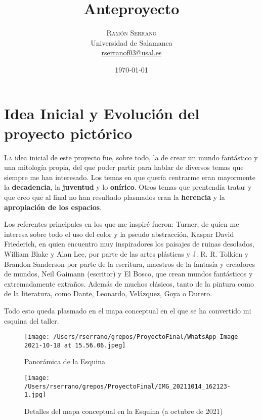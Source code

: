 \documentclass[twoside,twocolumn]{article}
\title{Anteproyecto} %
\author{%
\textsc{Ramón Serrano} \\[1ex] %
\normalsize Universidad de Salamanca \\ %
\normalsize \href{mailto:rserranof03@usal.es}{rserranof03@usal.es} %
}
\date{\today} %
\begin{document}
\maketitle


\section{Idea Inicial y Evolución del proyecto
pictórico\label{idea-inicial-y-evoluciuxf3n-del-proyecto-pictuxf3rico}}

\lettrine[nindent=0em,lines=3]{L}a idea inicial de este proyecto fue, sobre todo, la de crear un mundo
fantástico y una mitología propia, del que poder partir para hablar de
diversos temas que siempre me han interesado. Los temas en que quería
centrarme eran mayormente la \textbf{decadencia}, la \textbf{juventud} y
lo \textbf{onírico}. Otros temas que prentendía tratar y que creo que al
final no han resultado plasmados eran la \textbf{herencia} y la
\textbf{apropiación de los espacios}.

Los referentes principales en los que me inspiré fueron: Turner, de
quien me interesa sobre todo el uso del color y la pseudo abstracción,
Kaspar David Friederich, en quien encuentro muy inspiradores los
paisajes de ruinas desolados, William Blake y Alan Lee, por parte de las
artes plásticas y J. R. R. Tolkien y Brandon Sanderson por parte de la
escritura, maestros de la fantasía y creadores de mundos, Neil Gaimann
(escritor) y El Bosco, que crean mundos fantásticos y extremadamente
extraños. Además de muchos clásicos, tanto de la pintura como de la
literatura, como Dante, Leonardo, Velázquez, Goya o Durero.

Todo esto queda plasmado en el mapa conceptual en el que se ha
convertido mi esquina del
taller.

\begin{figure*}
  \centering
  \texttt{[image: /Users/rserrano/grepos/ProyectoFinal/WhatsApp Image 2021-10-18 at 15.56.06.jpeg]}
  \caption{Panorámica de la Esquina}
\end{figure*}

\begin{figure*}
  \centering
  \texttt{[image: /Users/rserrano/grepos/ProyectoFinal/IMG\_20211014\_162123-1.jpg]}
  \caption{Detalles del mapa conceptual en la Esquina (a octubre de 2021)}
\end{figure*}
\end{document}

